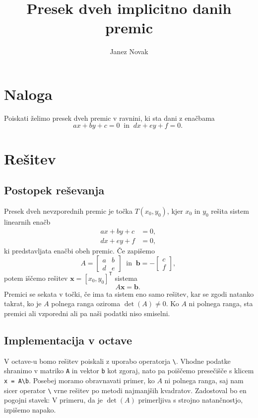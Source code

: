 \documentclass[A4]{article}
\begin{document}
\title{Presek dveh implicitno danih premic}
\author{Janez Novak}
\maketitle
\section{Naloga}
Poiskati želimo presek dveh premic v ravnini, ki sta dani z enačbama
\[
	ax + by + c = 0 \ \textrm{ in } \ dx + ey + f = 0 \textrm{. }
\]

\section{Rešitev}
\subsection{Postopek reševanja}
Presek dveh nevzporednih premic je točka $T(x_0, y_0)$, kjer $x_0$ in $y_0$ rešita sistem linearnih enačb
\begin{align*}
	ax + by + c &= 0 \textrm{, }\\
	dx + ey + f &= 0 \textrm{, }
\end{align*}
ki predstavljata enačbi obeh premic.
Če zapišemo 
\[
	A = \begin{bmatrix} a & b \\ d & e \end{bmatrix} \ \textrm{ in } \ \mathbf{b} = -\begin{bmatrix} c \\ f \end{bmatrix} \textrm{, }
\]
potem iščemo rešitev $\mathbf{x} = [x_0, y_0]^\mathsf{T}$ sistema
\[
	A \mathbf{x} = \mathbf{b} \textrm{. }
\]
Premici se sekata v točki, če ima ta sistem eno samo rešitev, kar se zgodi natanko takrat, ko je $A$ polnega ranga oziroma $\det(A) \neq 0$. 
Ko $A$ ni polnega ranga, sta premici ali vzporedni ali pa naši podatki niso smiselni.

\subsection{Implementacija v {\sf octave}}
V {\sf octave}-u bomo rešitev poiskali z uporabo operatorja \lstinline!\!.
Vhodne podatke shranimo v matriko \lstinline!A! in vektor \lstinline!b! kot
zgoraj, nato pa poiščemo presečišče s klicem \lstinline!x = A\b!. Posebej moramo
obravnavati primer, ko $A$ ni polnega ranga, saj nam sicer operator
\lstinline!\! vrne rešitev po metodi najmanjših kvadratov. Zadostoval bo en
pogojni stavek: V primeru, da je $\det(A)$ primerljiva s strojno natančnostjo,
izpišemo napako.
\end{document}
